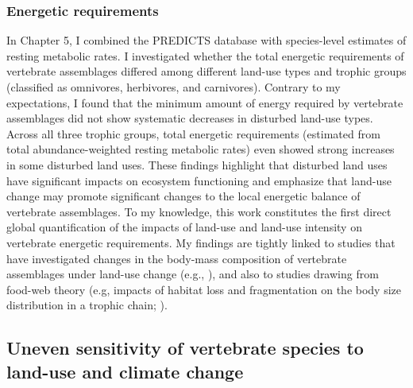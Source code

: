 \subsubsection{Energetic requirements}
In Chapter 5, I combined the PREDICTS database with species-level estimates of resting metabolic rates. I investigated whether the total energetic requirements of vertebrate assemblages differed among different land-use types and trophic groups (classified as omnivores, herbivores, and carnivores). Contrary to my expectations, I found that the minimum amount of energy required by vertebrate assemblages did not show systematic decreases in disturbed land-use types. Across all three trophic groups, total energetic requirements (estimated from total abundance-weighted resting metabolic rates) even showed strong increases in some disturbed land uses. These findings highlight that disturbed land uses have significant impacts on ecosystem functioning and emphasize that land-use change may promote significant changes to the local energetic balance of vertebrate assemblages. To my knowledge, this work constitutes the first direct global quantification of the impacts of land-use and land-use intensity on vertebrate energetic requirements. My findings are tightly linked to studies that have investigated changes in the body-mass composition of vertebrate assemblages under land-use change (e.g., \citet{Newbold2020}), and also to studies drawing from food-web theory (e.g, impacts of habitat loss and fragmentation on the body size distribution in a trophic chain; \citet{Hillaert2020}). 



\subsection{Uneven sensitivity of vertebrate species to land-use and climate change}

